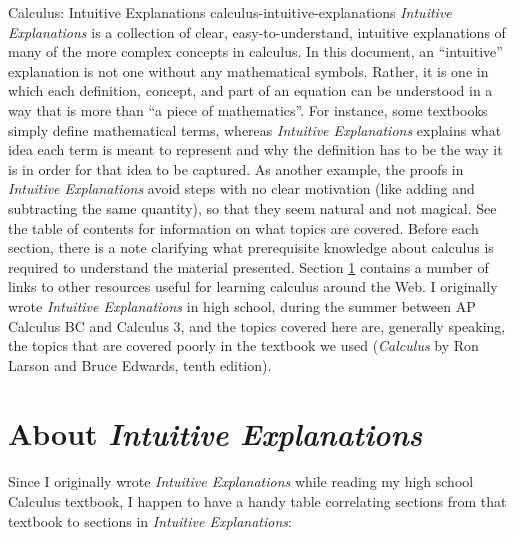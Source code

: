 \documentclass{myarticle}
\theoremstyle{nospace}
\newtheorem{old series theorem}{Theorem}
\newenvironment{series theorem}
{\begin{mdframed}\begin{old series theorem}}
    {\end{old series theorem}\end{mdframed}}
\begin{document}
\titlepage
{Calculus: Intuitive Explanations}
{calculus-intuitive-explanations}
{\textit{Intuitive Explanations} is a collection of clear,
  easy-to-understand, intuitive explanations of many of the more
  complex concepts in calculus. In this document, an ``intuitive''
  explanation is not one without any mathematical symbols. Rather, it
  is one in which each definition, concept, and part of an equation
  can be understood in a way that is more than ``a piece of
  mathematics''. For instance, some textbooks simply define
  mathematical terms, whereas \textit{Intuitive Explanations} explains
  what idea each term is meant to represent and why the definition has
  to be the way it is in order for that idea to be captured. As
  another example, the proofs in \textit{Intuitive Explanations} avoid
  steps with no clear motivation (like adding and subtracting the same
  quantity), so that they seem natural and not magical. See the table
  of contents for information on what topics are covered. Before each
  section, there is a note clarifying what prerequisite knowledge
  about calculus is required to understand the material presented.
  Section \ref{sec:about} contains a number of links to other
  resources useful for learning calculus around the Web. I originally
  wrote \textit{Intuitive Explanations} in high school, during the
  summer between AP Calculus BC and Calculus 3, and the topics covered
  here are, generally speaking, the topics that are covered poorly in
  the textbook we used (\textit{Calculus} by Ron Larson and Bruce
  Edwards, tenth edition).}

\tableofcontents
\clearpage

\section{About \textit{Intuitive Explanations}}
\label{sec:about}

Since I originally wrote \textit{Intuitive Explanations} while reading
my high school Calculus textbook, I happen to have a handy table
correlating sections from that textbook to sections in
\textit{Intuitive Explanations}:
\end{document}
